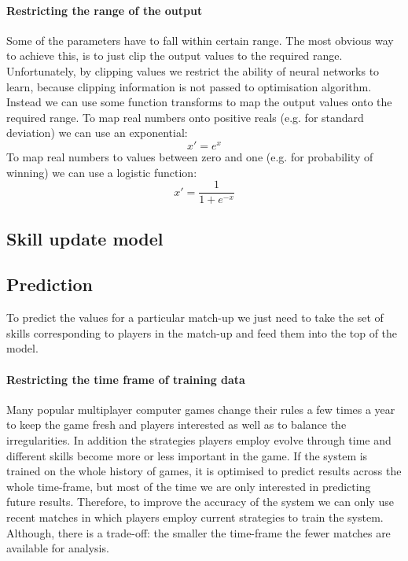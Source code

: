 \documentclass[12pt,a4paper]{book}
\begin{document}
\paragraph{Restricting the range of the output}
Some of the parameters have to fall within certain range.
The most obvious way to achieve this, is to just clip the output values to the required range.
Unfortunately, by clipping values we restrict the ability of neural networks to learn, because clipping information is not passed to optimisation algorithm.
Instead we can use some function transforms to map the output values onto the required range.
To map real numbers onto positive reals (e.g. for standard deviation) we can use an exponential:
\begin{equation}
x' = e^x
\end{equation}
To map real numbers to values between zero and one (e.g. for probability of winning) we can use a logistic function:
\begin{equation}
x' = \frac{1}{1+e^{-x}}
\end{equation}

\subsection{Skill update model}

\subsection{Prediction}
To predict the values for a particular match-up we just need to take the set of skills corresponding to players in the match-up and feed them into the top of the model.

\paragraph{Restricting the time frame of training data}
Many popular multiplayer computer games change their rules a few times a year to keep the game fresh and players interested as well as to balance the irregularities.
In addition the strategies players employ evolve through time and different skills become more or less important in the game.
If the system is trained on the whole history of games, it is optimised to predict results across the whole time-frame, but most of the time we are only interested in predicting future results.
Therefore, to improve the accuracy of the system we can only use recent matches in which players employ current strategies to train the system.
Although, there is a trade-off: the smaller the time-frame the fewer matches are available for analysis.
\end{document}
